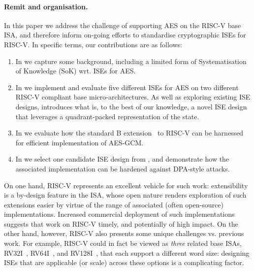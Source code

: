 
\paragraph{Remit and organisation.}

In this paper we address the challenge of supporting AES on the RISC-V base
ISA, and therefore inform on-going efforts to standardise cryptographic ISEs 
for RISC-V.  In specific terms, our contributions are as follows:

\begin{enumerate}

\item In 
      we capture some background, including a limited form of
      Systematisation of Knowledge (SoK)
      wrt. ISEs for AES.

\item In 
      we implement and evaluate five different ISEs for AES on two different 
      RISC-V compliant base micro-architectures.
      As well as exploring existing ISE designs, 
      introduces what is, to the best of our knowledge, a novel ISE design 
      that leverages a quadrant-packed representation of the state.

\item In
      we evaluate how the
      standard 
      B 
      extension~\cite[Section 21]{RV:ISA:I:19}
      to RISC-V can be harnessed for efficient implementation of AES-GCM.

\item In
      we select one candidate ISE design from 
      ,
      and demonstrate how the associated implementation can be hardened
      against DPA-style attacks.

\end{enumerate}

\noindent
On one hand, 
RISC-V represents an excellent vehicle for such work:
extensibility is a by-design feature in the ISA, whose open nature renders
exploration of such extensions easier by virtue of the range of associated 
(often open-source) implementations.  
Increased commercial deployment of such implementations suggests that work 
on RISC-V timely, and potentially of high impact.
On the other hand, however,
RISC-V also presents some unique challenges vs. previous work.
For example,
RISC-V could in fact be viewed as {\em three} related base ISAs,
 RV32I~\cite[Section 2]{RV:ISA:I:19},
 RV64I~\cite[Section 5]{RV:ISA:I:19},
and
RV128I~\cite[Section 6]{RV:ISA:I:19},
that each support a different word size:
designing ISEs that are applicable (or scale) across these options is a
complicating factor.

%

